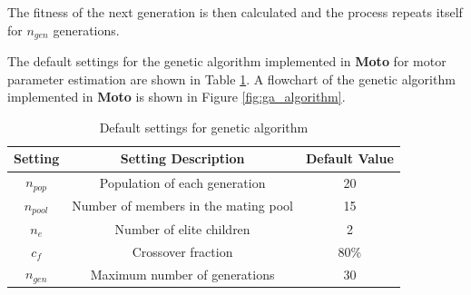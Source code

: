 \documentclass{article}
\begin{document}
The fitness of the next generation is then calculated and the process repeats itself for $n_{gen}$ generations.

The default settings for the genetic algorithm implemented in \textbf{Moto} for motor parameter estimation are shown in Table \ref{tab:ga_default}. A flowchart of the genetic algorithm implemented in \textbf{Moto} is shown in Figure \ref{fig:ga_algorithm}.

\begin{table}[htp]
	\renewcommand{\arraystretch}{1.3}
	\begin{center}
	\begin{tabular}{|c|c|c|}
        \hline
        Setting  	& Setting Description  & Default Value	\\ \hline
        $n_{pop}$  	& Population of each generation  & 20	\\ \hline
        $n_{pool}$  	& Number of members in the mating pool  & 15 \\ \hline
        $n_{e}$  	& Number of elite children  & 2	\\ \hline
        $c_{f}$  	& Crossover fraction  & 80\%	\\ \hline
        $n_{gen}$  	& Maximum number of generations  & 30	\\ \hline
    \end{tabular}
	\caption{Default settings for genetic algorithm}
	\label{tab:ga_default}
	\end{center}
\end{table}
\end{document}
